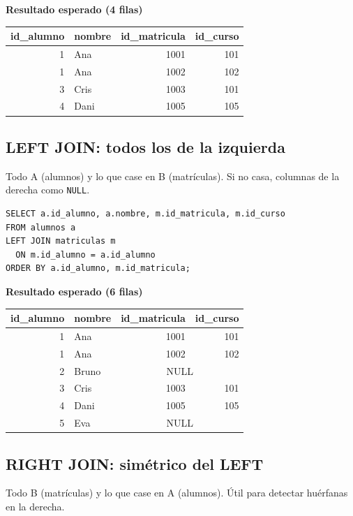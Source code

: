 \documentclass[11pt,a4paper]{article}
\begin{document}
\textbf{Resultado esperado (4 filas)}
\begin{center}
\begin{tabular}{r l r r}
\toprule
id\_alumno & nombre & id\_matricula & id\_curso \\
\midrule
1 & Ana  & 1001 & 101 \\
1 & Ana  & 1002 & 102 \\
3 & Cris & 1003 & 101 \\
4 & Dani & 1005 & 105 \\
\bottomrule
\end{tabular}
\end{center}

\subsection{LEFT JOIN: todos los de la izquierda}
\begin{tcolorbox}[title=Idea]
Todo A (alumnos) y lo que case en B (matrículas). Si no casa, columnas de la derecha como \texttt{NULL}.
\end{tcolorbox}

\begin{lstlisting}
SELECT a.id_alumno, a.nombre, m.id_matricula, m.id_curso
FROM alumnos a
LEFT JOIN matriculas m
  ON m.id_alumno = a.id_alumno
ORDER BY a.id_alumno, m.id_matricula;
\end{lstlisting}

\textbf{Resultado esperado (6 filas)}
\begin{center}
\begin{tabular}{r l r r}
\toprule
id\_alumno & nombre & id\_matricula & id\_curso \\
\midrule
1 & Ana   & 1001 & 101 \\
1 & Ana   & 1002 & 102 \\
2 & Bruno & \multicolumn{2}{c}{NULL} \\
3 & Cris  & 1003 & 101 \\
4 & Dani  & 1005 & 105 \\
5 & Eva   & \multicolumn{2}{c}{NULL} \\
\bottomrule
\end{tabular}
\end{center}

\subsection{RIGHT JOIN: simétrico del LEFT}
\begin{tcolorbox}[title=Idea]
Todo B (matrículas) y lo que case en A (alumnos). Útil para detectar huérfanas en la derecha.
\end{tcolorbox}
\end{document}
